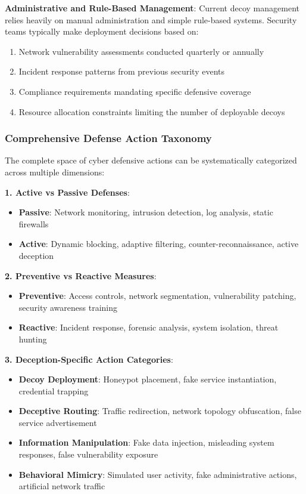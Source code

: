 \documentclass[12pt,twoside]{article}
\theoremstyle{definition}
\theoremstyle{plain}
\begin{document}
\textbf{Administrative and Rule-Based Management}: Current decoy management relies heavily on manual administration and simple rule-based systems. Security teams typically make deployment decisions based on:

\begin{enumerate}
\item Network vulnerability assessments conducted quarterly or annually
\item Incident response patterns from previous security events
\item Compliance requirements mandating specific defensive coverage
\item Resource allocation constraints limiting the number of deployable decoys
\end{enumerate}

\subsubsection{Comprehensive Defense Action Taxonomy}

The complete space of cyber defensive actions can be systematically categorized across multiple dimensions:

\textbf{1. Active vs Passive Defenses}:
\begin{itemize}
\item \textbf{Passive}: Network monitoring, intrusion detection, log analysis, static firewalls
\item \textbf{Active}: Dynamic blocking, adaptive filtering, counter-reconnaissance, active deception
\end{itemize}

\textbf{2. Preventive vs Reactive Measures}:
\begin{itemize}
\item \textbf{Preventive}: Access controls, network segmentation, vulnerability patching, security awareness training
\item \textbf{Reactive}: Incident response, forensic analysis, system isolation, threat hunting
\end{itemize}

\textbf{3. Deception-Specific Action Categories}:
\begin{itemize}
\item \textbf{Decoy Deployment}: Honeypot placement, fake service instantiation, credential trapping
\item \textbf{Deceptive Routing}: Traffic redirection, network topology obfuscation, false service advertisement
\item \textbf{Information Manipulation}: Fake data injection, misleading system responses, false vulnerability exposure
\item \textbf{Behavioral Mimicry}: Simulated user activity, fake administrative actions, artificial network traffic
\end{itemize}
\end{document}
